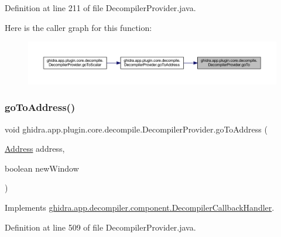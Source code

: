 Definition at line 211 of file Decompiler\+Provider.\+java.

Here is the caller graph for this function\+:
\nopagebreak
\begin{figure}[H]
\begin{center}
\leavevmode
\includegraphics[width=350pt]{classghidra_1_1app_1_1plugin_1_1core_1_1decompile_1_1_decompiler_provider_abc292f1da8451745af1bdeb21b005d81_icgraph}
\end{center}
\end{figure}
\mbox{\label{classghidra_1_1app_1_1plugin_1_1core_1_1decompile_1_1_decompiler_provider_af9cbc00f79147db02fcb654511044e78}} 
\subsubsection{\texorpdfstring{goToAddress()}{goToAddress()}}
{\footnotesize\ttfamily void ghidra.\+app.\+plugin.\+core.\+decompile.\+Decompiler\+Provider.\+go\+To\+Address (\begin{DoxyParamCaption}\item[{\mbox{\hyperlink{class_address}{Address}}}]{address,  }\item[{boolean}]{new\+Window }\end{DoxyParamCaption})\hspace{0.3cm}{\ttfamily [inline]}}



Implements \mbox{\hyperlink{interfaceghidra_1_1app_1_1decompiler_1_1component_1_1_decompiler_callback_handler_a83ea9c0c73ddd58a0d44de4490752a6c}{ghidra.\+app.\+decompiler.\+component.\+Decompiler\+Callback\+Handler}}.



Definition at line 509 of file Decompiler\+Provider.\+java.

